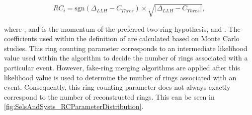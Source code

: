 \begin{equation}
  \label{eqn:SelsAndSysts_Systs_RCParam}
  RC_{i} = \text{sgn} \left(\Delta_{LLH} - C_{Thres} \right) \times \sqrt{\lvert \Delta_{LLH} - C_{Thres} \rvert},
\end{equation}

where , and  is the momentum of the preferred two-ring hypothesis, and . The coefficients used within the definition of  are calculated based on Monte Carlo studies. This ring counting parameter corresponds to an intermediate likelihood value used within the \fq algorithm to decide the number of rings associated with a particular event. However, fake-ring merging algorithms are applied after this likelihood value is used to determine the number of rings associated with an event. Consequently, this ring counting parameter does not always exactly correspond to the number of reconstructed rings. This can be seen in \autoref{fig:SelsAndSysts_RCParameterDistribution}.

